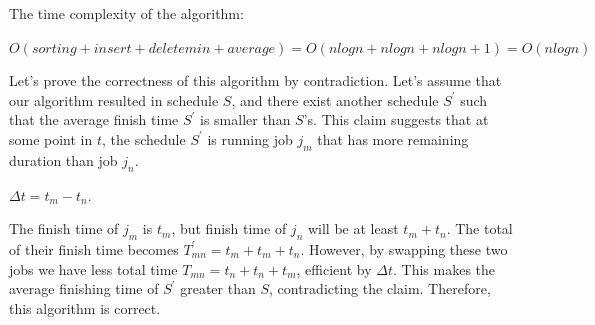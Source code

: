 \documentclass{article}
\begin{document}
\begin{enumerate}
  The time complexity of the algorithm:

  $O(sorting+insert+deletemin+average)=O(nlogn+nlogn+nlogn+1)=O(nlogn)$

  Let's prove the correctness of this algorithm by contradiction.
  Let's assume that our algorithm resulted in schedule $S$, and there exist another schedule $S^\prime$ such that the average finish time $S^\prime$ is smaller than $S$'s.
  This claim suggests that at some point in $t$, the schedule $S^\prime$ is running job $j_m$ that has more remaining duration than job $j_n$.

  $\Delta t=t_m-t_n$.

  The finish time of $j_m$ is $t_m$, but finish time of $j_n$ will be at least $t_m+t_n$.
  The total of their finish time becomes $T^\prime_{mn}=t_m+t_m+t_n$.
  However, by swapping these two jobs we have less total time $T_{mn}=t_n+t_n+t_m$, efficient by $\Delta t$.
  This makes the average finishing time of $S^\prime$ greater than $S$, contradicting the claim.
  Therefore, this algorithm is correct.
\end{enumerate}
\end{document}

